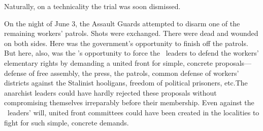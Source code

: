 Naturally, on a technicality the trial was soon dismissed.

On the night of June 3, the Assault Guards attempted to disarm one of the remaining workers’ patrols. Shots were exchanged. There were dead and wounded on both sides. Here was the government’s opportunity to finish off the patrols. But here, also, was the \POUM’s opportunity to force the \CNT\ leaders to defend the workers’ elementary rights by demanding a united front for simple, concrete proposals---defense of free assembly, the press, the patrols, common defense of workers’ districts against the Stalinist hooligans, freedom of political prisoners, etc.\@ The anarchist leaders could have hardly rejected these proposals without compromising themselves irreparably before their membership. Even against the \CNT\ leaders’ will, united front committees could have been created in the localities to fight for such simple, concrete demands.

